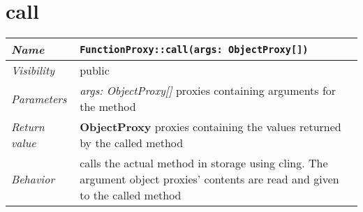 \section{call}
\begin{longtable}{p{3cm} @{\hskip 1cm} p{12cm}}
	\hline

	\textit{Name} & \texttt{FunctionProxy::call(args: ObjectProxy[])}\\
	\hline

	\textit{Visibility} & public\\
	\hline

	\textit{Parameters} & \textit{args: ObjectProxy[]} proxies containing arguments for the  method\\
	\hline

	\textit{Return value} & \textbf{ ObjectProxy} proxies containing the values returned by the called method\\
	\hline

	\textit{Behavior} & calls the actual method in storage using cling.
			The argument object proxies' contents are read and given to the called method  \\
	\hline

\end{longtable} \pagebreak
